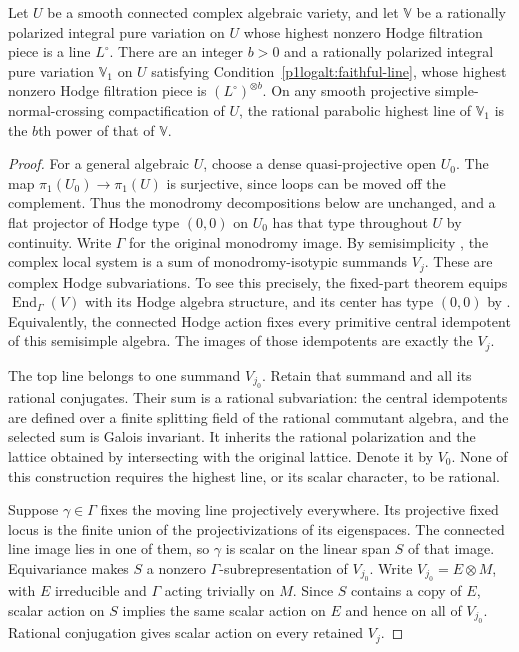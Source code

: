 \begin{lemma}\label{p1logalt:kernel}
Let $U$ be a smooth connected complex algebraic variety, and
let $\mathbb V$ be a rationally polarized integral pure variation on $U$
whose highest nonzero Hodge filtration piece is a line $L^\circ$.
There are an integer $b>0$ and a rationally polarized integral pure
variation $\mathbb V_1$ on $U$ satisfying
Condition~\eqref{p1logalt:faithful-line}, whose highest nonzero Hodge
filtration piece is $(L^\circ)^{\otimes b}$.  On any smooth projective
simple-normal-crossing compactification of $U$, the rational parabolic
highest line of $\mathbb V_1$ is the $b$th power of that of $\mathbb V$.
\end{lemma}

\begin{proof}
For a general algebraic $U$, choose a dense quasi-projective open
$U_0$.  The map $\pi_1(U_0)\to\pi_1(U)$ is surjective, since loops
can be moved off the complement.  Thus the monodromy decompositions
below are unchanged, and a flat projector of Hodge type $(0,0)$ on
$U_0$ has that type throughout $U$ by continuity.
Write $\Gamma$ for the original monodromy image.  By semisimplicity
\cite[Theorem~4.2.6 and the added-in-proof note]{DeligneHodgeII}, the complex local system is a sum of
monodromy-isotypic summands $V_j$. These are complex Hodge subvariations. To see this
precisely, the fixed-part theorem equips
$\operatorname{End}_{\Gamma}(V)$ with its Hodge algebra structure, and its
center has type $(0,0)$ by \cite[Corollary 4.2.8(i),(ii)]{DeligneHodgeII}.
Equivalently, the connected Hodge action fixes every primitive central
idempotent of this semisimple algebra.  The images of those idempotents
are exactly the $V_j$.

The top line belongs to one summand $V_{j_0}$.  Retain that summand and
all its rational conjugates.  Their sum is a rational subvariation:
the central idempotents are defined over a finite splitting field of the
rational commutant algebra, and the selected sum is Galois invariant.
It inherits the rational polarization and the lattice obtained by
intersecting with the original lattice.  Denote it by $V_0$.  None of
this construction requires the highest line, or its scalar character,
to be rational.

Suppose $\gamma\in\Gamma$ fixes the moving line projectively everywhere.
Its projective fixed locus is the finite union of the projectivizations
of its eigenspaces.  The connected line image lies in one of them, so
$\gamma$ is scalar on the linear span $S$ of that image.  Equivariance
makes $S$ a nonzero $\Gamma$-subrepresentation of $V_{j_0}$.  Write
$V_{j_0}=E\otimes M$, with $E$ irreducible and $\Gamma$ acting trivially
on $M$.  Since $S$ contains a copy of $E$, scalar action on $S$ implies
the same scalar action on $E$ and hence on all of $V_{j_0}$.  Rational
conjugation gives scalar action on every retained $V_j$.


\end{proof}
